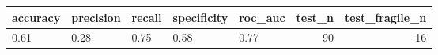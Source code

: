 \begin{tabular}{lllllrr}
\toprule
accuracy & precision & recall & specificity & roc\_auc & test\_n & test\_fragile\_n \\
\midrule
0.61 & 0.28 & 0.75 & 0.58 & 0.77 & 90 & 16 \\
\bottomrule
\end{tabular}
